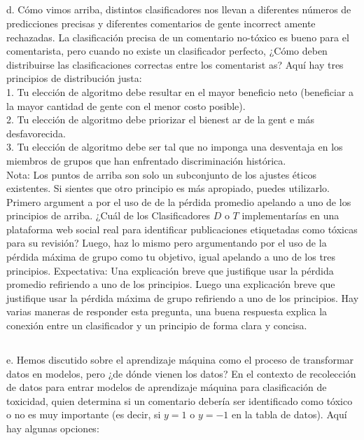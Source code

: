 \documentclass{article}
\begin{document}
\subsection{}
d. Cómo vimos arriba, distintos clasificadores nos llevan a diferentes números de predicciones precisas y diferentes comentarios de gente incorrect amente rechazadas. La clasificación precisa de un comentario no-tóxico es bueno para el comentarista, pero cuando no existe un clasificador perfecto, ¿Cómo deben distribuirse las clasificaciones correctas entre los comentarist as? Aquí hay tres principios de distribución justa:\\
1. Tu elección de algoritmo debe resultar en el mayor beneficio neto (beneficiar a la mayor cantidad de gente con el menor costo posible).\\
2. Tu elección de algoritmo debe priorizar el bienest ar de la gent e más desfavorecida.\\
3. Tu elección de algoritmo debe ser tal que no imponga una desventaja en los miembros de grupos que han enfrentado discriminación histórica.\\
Nota: Los puntos de arriba son solo un subconjunto de los ajustes éticos existentes. Si sientes que otro principio es más apropiado, puedes utilizarlo.
Primero argument a por el uso de de la pérdida promedio apelando a uno de los principios de arriba. ¿Cuál de los Clasificadores $D$ o $T$ implementarías en una plataforma web social real para identificar publicaciones etiquetadas como tóxicas para su revisión? Luego, haz lo mismo pero argumentando por el uso de la pérdida máxima de grupo como tu objetivo, igual apelando a uno de los tres principios.
Expectativa: Una explicación breve que justifique usar la pérdida promedio refiriendo a uno de los principios. Luego una explicación breve que justifique usar la pérdida máxima de grupo refiriendo a uno de los principios. Hay varias maneras de responder esta pregunta, una buena respuesta explica la conexión entre un clasificador y un principio de forma clara y concisa.

\subsection{}
e. Hemos discutido sobre el aprendizaje máquina como el proceso de transformar datos en modelos, pero ¿de dónde vienen los datos? En el contexto de recolección de datos para entrar modelos de aprendizaje máquina para clasificación de toxicidad, quien determina si un comentario debería ser identificado como tóxico o no es muy importante (es decir, si $y=1$ o $y=-1$ en la tabla de datos). Aquí hay algunas opciones:\\
\end{document}
